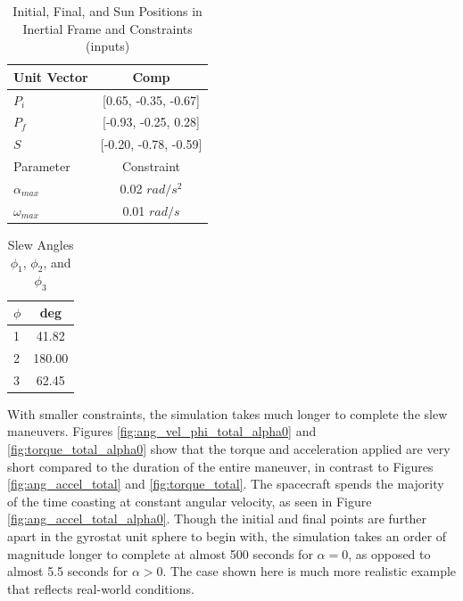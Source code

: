 \documentclass[letterpaper, preprint, paper,11pt]{AAS}	%
\begin{document}
	\begin{multicols}{2}
		\begin{center}
			\begin{table}[H]
				\centering
				\caption{Initial, Final, and Sun Positions in Inertial Frame and Constraints (inputs)}
				\begin{tabular}{lc}
					\toprule
					\midrule
					Unit Vector & Comp \\
					\midrule
					$P_i$ & [0.65, -0.35, -0.67] \\
					$P_f$ & [-0.93, -0.25, 0.28] \\ 
					$S$ & [-0.20, -0.78, -0.59] \\
					\midrule
					\midrule
					Parameter & Constraint \\ 
					\midrule
					$\alpha_{max}$ & 0.02 $rad/s^2$ \\
					$\omega_{max}$ & 0.01 $rad/s$ \\ 
					\midrule
					\bottomrule
				\end{tabular}%
				\label{tab:alpha0_PiPfS_AWmax}%
			\end{table}
		\end{center}
	\columnbreak
		\begin{center}
			\begin{table}[H]
				\centering
				\caption{Slew Angles $\phi_1$, $\phi_2$, and $\phi_3$}
				\begin{tabular}{lc}
					\toprule
					\midrule
					$\phi$ & deg \\
					\midrule
					1 & 41.82 \\
					2 & 180.00 \\ 
					3 & 62.45 \\
					\midrule
					\bottomrule
				\end{tabular}%
				\label{tab:alpha0_phi_123}%
			\end{table}%
		\end{center}
	\end{multicols}

With smaller constraints, the simulation takes much longer to complete the slew maneuvers. Figures \ref{fig:ang_vel_phi_total_alpha0} and \ref{fig:torque_total_alpha0} show that the torque and acceleration applied are very short compared to the duration of the entire maneuver, in contrast to Figures \ref{fig:ang_accel_total} and \ref{fig:torque_total}. The spacecraft spends the majority of the time coasting at constant angular velocity, as seen in Figure \ref{fig:ang_accel_total_alpha0}. Though the initial and final points are further apart in the gyrostat unit sphere to begin with, the simulation takes an order of magnitude longer to complete at almost 500 seconds for $\alpha = 0$, as opposed to almost 5.5 seconds for $\alpha > 0$. The case shown here is much more realistic example that reflects real-world conditions. 
			
\end{document}
